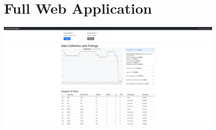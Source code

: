     
\begin{landscape}
\begin{figure}[ht]
\begin{minipage}{\linewidth}
\section{Full Web Application}

   \centering
    \includegraphics[width=0.99\linewidth]{pages/Chapter4/Chapter 4 Images/newWebApp.PNG}
    
    \label{appendix:full_web_app}

\end{minipage}
\end{figure}
    \end{landscape}
    







